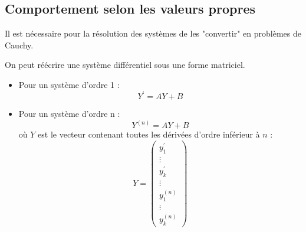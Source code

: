\subsection{Comportement selon les valeurs propres}














Il est nécessaire pour la résolution des systèmes de les "convertir" en problèmes de Cauchy.
\begin{prop}
On peut réécrire une système différentiel sous une forme matriciel.
\begin{itemize}
    \item Pour un système d'ordre  1 : $$Y^{\prime}=AY+B$$
    \item Pour un système d'ordre n :$$Y^{(n)}=AY+B$$
    où $Y$ est le vecteur contenant toutes les dérivées d'ordre inférieur à $n$ :
    $$Y=\begin{pmatrix}y_1^{\prime}\\\vdots\\y_k^{\prime}\\\vdots\\y_1^{(n)}\\\vdots\\y_k^{(n)}\end{pmatrix}$$
\end{itemize}
\end{prop}
